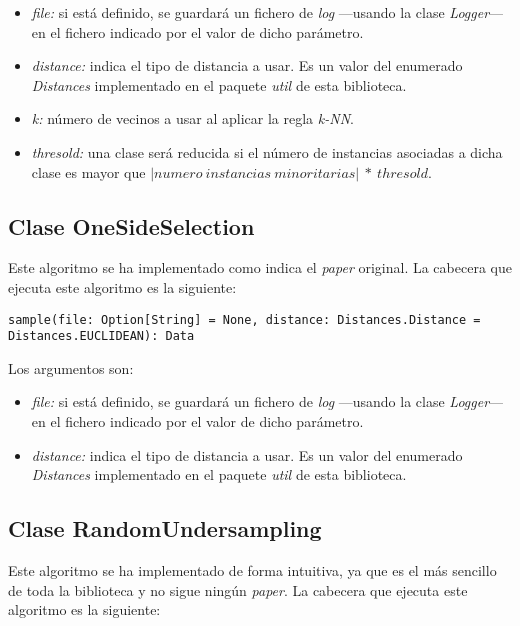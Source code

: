 \begin{itemize}
    \item \textit{file:} si está definido, se guardará un fichero de \textit{log} —usando la clase \textit{Logger}— en el fichero indicado por el valor de dicho parámetro.
    \item \textit{distance:} indica el tipo de distancia a usar. Es un valor del enumerado \textit{Distances} implementado en el paquete \textit{util} de esta biblioteca.
    \item \textit{k:} número de vecinos a usar al aplicar la regla \textit{k-NN}.
    \item \textit{thresold:} una clase será reducida si el número de instancias asociadas a dicha clase es mayor que $\left | numero\ instancias\ minoritarias \right | \ *\ thresold$.
\end{itemize}

\subsection{Clase OneSideSelection} \label{subsec:impl_onesideselection}

Este algoritmo se ha implementado como indica el \textit{paper} original. La cabecera que ejecuta este algoritmo es la siguiente:

\begin{lstlisting}[frame=single, basicstyle=\scriptsize, breaklines=true]
sample(file: Option[String] = None, distance: Distances.Distance = Distances.EUCLIDEAN): Data
\end{lstlisting}

Los argumentos son:

\begin{itemize}
    \item \textit{file:} si está definido, se guardará un fichero de \textit{log} —usando la clase \textit{Logger}— en el fichero indicado por el valor de dicho parámetro.
    \item \textit{distance:} indica el tipo de distancia a usar. Es un valor del enumerado \textit{Distances} implementado en el paquete \textit{util} de esta biblioteca.
\end{itemize}

\subsection{Clase RandomUndersampling} \label{subsec:impl_randomundersampling}

Este algoritmo se ha implementado de forma intuitiva, ya que es el más sencillo de toda la biblioteca y no sigue ningún \textit{paper}. La cabecera que ejecuta este algoritmo es la siguiente:

